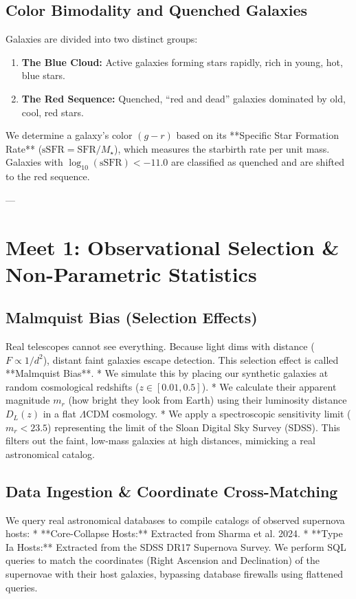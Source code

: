\documentclass[11pt,a4paper]{article}
\begin{document}
\subsection{Color Bimodality and Quenched Galaxies}
Galaxies are divided into two distinct groups:
\begin{enumerate}
    \item \textbf{The Blue Cloud:} Active galaxies forming stars rapidly, rich in young, hot, blue stars.
    \item \textbf{The Red Sequence:} Quenched, ``red and dead'' galaxies dominated by old, cool, red stars.
\end{enumerate}
We determine a galaxy's color $(g-r)$ based on its **Specific Star Formation Rate** ($\text{sSFR} = \text{SFR}/M_\star$), which measures the starbirth rate per unit mass. Galaxies with $\log_{10}(\text{sSFR}) < -11.0$ are classified as quenched and are shifted to the red sequence.

---

\section{Meet 1: Observational Selection \& Non-Parametric Statistics}

\subsection{Malmquist Bias (Selection Effects)}
Real telescopes cannot see everything. Because light dims with distance ($F \propto 1/d^2$), distant faint galaxies escape detection. This selection effect is called **Malmquist Bias**.
*   We simulate this by placing our synthetic galaxies at random cosmological redshifts ($z \in [0.01, 0.5]$).
*   We calculate their apparent magnitude $m_r$ (how bright they look from Earth) using their luminosity distance $D_L(z)$ in a flat $\Lambda$CDM cosmology.
*   We apply a spectroscopic sensitivity limit ($m_r < 23.5$) representing the limit of the Sloan Digital Sky Survey (SDSS). This filters out the faint, low-mass galaxies at high distances, mimicking a real astronomical catalog.

\subsection{Data Ingestion \& Coordinate Cross-Matching}
We query real astronomical databases to compile catalogs of observed supernova hosts:
*   **Core-Collapse Hosts:** Extracted from Sharma et al. 2024.
*   **Type Ia Hosts:** Extracted from the SDSS DR17 Supernova Survey.
We perform SQL queries to match the coordinates (Right Ascension and Declination) of the supernovae with their host galaxies, bypassing database firewalls using flattened queries.
\end{document}
